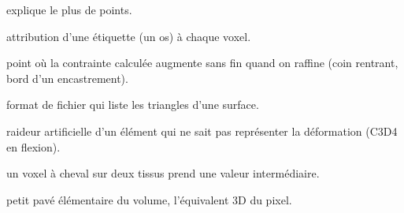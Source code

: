 \documentclass[11pt,a4paper]{article}
\begin{document}
\begin{description}[style=nextline, leftmargin=1.2cm, itemsep=1pt]
  explique le plus de points.
  \item[Segmentation] attribution d'une étiquette (un os) à chaque voxel.
  \item[Singularité] point où la contrainte calculée augmente sans fin quand on raffine (coin rentrant, bord d'un
  encastrement).
  \item[STL] format de fichier qui liste les triangles d'une surface.
  \item[Verrouillage] raideur artificielle d'un élément qui ne sait pas représenter la déformation (C3D4 en flexion).
  \item[Volume partiel] un voxel à cheval sur deux tissus prend une valeur intermédiaire.
  \item[Voxel] petit pavé élémentaire du volume, l'équivalent 3D du pixel.
\end{description}
\end{document}
